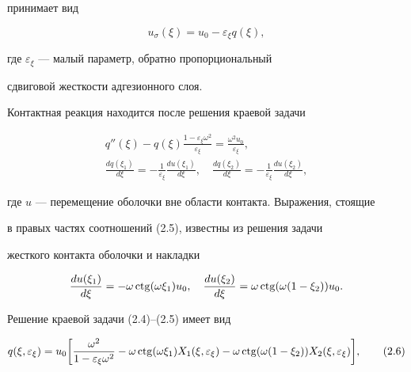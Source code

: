 принимает вид


$$


u_{\sigma}(\xi)=u_{0}-\varepsilon_{\xi} q(\xi),


$$


где $\varepsilon_{\xi}$ --- малый параметр, обратно пропорциональный


сдвиговой жесткости адгезионного слоя.





Контактная реакция находится после решения краевой задачи


\begin{gather}


q''(\xi)-q(\xi)


\frac{1-\varepsilon_{\xi}\omega^{2}}{\varepsilon_{\xi}}=


\frac{\omega^{2} u_{0}}{\varepsilon_{\xi}},


\tag{2.4} \\


\frac{dq(\xi_{1})}{d\xi}=-\frac{1}{\varepsilon_{\xi}}\frac{du(\xi_{1})}{d\xi},


\quad


\frac{dq(\xi_{2})}{d\xi}=-\frac{1}{\varepsilon_{\xi}}\frac{du(\xi_{2})}{d\xi},


\tag{2.5}


\end{gather}


где $u$ --- перемещение оболочки вне области контакта. Выражения, стоящие


в правых частях соотношений (2.5), известны из решения задачи


жесткого контакта оболочки и накладки


$$


\frac{du(\xi_{1})}{d\xi}=-\omega \ctg(\omega \xi_{1})u_{0}, \quad


\frac{du(\xi_{2})}{d\xi}=\omega \ctg(\omega(1-\xi_{2}))u_{0}.


$$


Решение краевой задачи (2.4)--(2.5) имеет вид


\begin{equation}


q(\xi,\varepsilon_{\xi})=u_{0} \bigg[ \frac {\omega^{2}}


{1-\varepsilon_{\xi}\omega^{2}}-


\omega \ctg(\omega \xi_{1})X_{1}(\xi,\varepsilon_{\xi})-


\omega \ctg(\omega(1-\xi_{2}))X_{2}(\xi,\varepsilon_{\xi})\bigg],


\tag{2.6}


\end{equation}


